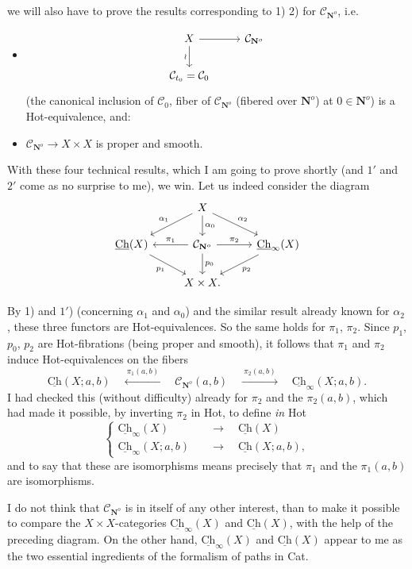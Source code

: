 \documentclass[11pt]{article}
\newcommand{\printedpage}[1]{\marginpar{\footnotesize p.~#1}}
\newcommand{\msp}[1]{\marginpar{\footnotesize [#1]}}
\newcommand{\Ch}{\underline{\mathrm{Ch}}}
\newcommand{\cC}{\mathcal{C}}
\newcommand{\NN}{\mathbf{N}^{o}}
\begin{document}
\printedpage{99}
we will also have to prove the results corresponding to 1) 2) for $\cC_{\NN}$, i.e.

\begin{itemize}[label={}]
\item[1$'$)]
\[
\begin{tikzcd}
X \ar[r] \ar[d,"\wr"'] & \cC_{\NN} \\
\cC_{t_0} = \cC_0 &
\end{tikzcd}
\]
(the canonical inclusion of $\cC_0$, fiber of $\cC_{\NN}$ (fibered over $\mathbf{N}^o$) at $0 \in \mathbf{N}^o$) is a Hot-equivalence, and:

\item[2$'$)] $\cC_{\NN} \longrightarrow X \times X$ is proper and smooth.
\end{itemize}

With these four technical results, which I am going to prove shortly (and $1'$ and $2'$ come as no surprise to me), we win. Let us indeed consider the diagram
\[
\begin{tikzcd}
& X \ar[dl,"\alpha_1"'] \ar[d,"\alpha_0"] \ar[dr,"\alpha_2"] & \\
\Ch(X) \ar[dr,"p_1"'] & \cC_{\NN} \ar[l,"\pi_1"'] \ar[r,"\pi_2"] \ar[d,"p_0"] & \Ch_{\infty}(X) \ar[dl,"p_2"] \\
& X \times X. &
\end{tikzcd}
\]

By 1) and $1'$) (concerning $\alpha_1$ and $\alpha_0$) and the similar result
\msp{page 159}
already known for $\alpha_2$, these three functors are Hot-equivalences. So the same holds for $\pi_1$, $\pi_2$. Since $p_1$, $p_0$, $p_2$ are Hot-fibrations (being proper and smooth), it follows that $\pi_1$ and $\pi_2$ induce Hot-equivalences on the fibers
\[
\Ch(X;a,b) \quad \xleftarrow{\ \pi_1(a,b)\ } \quad \cC_{\NN}(a,b) \quad \xrightarrow{\ \pi_2(a,b)\ } \quad \Ch_{\infty}(X;a,b).
\]
I had checked this (without difficulty) already for $\pi_2$ and the $\pi_2(a,b)$, which had made it possible, by inverting $\pi_2$ in Hot, to define \textit{in} Hot
\[
\left\{
\begin{aligned}
\Ch_{\infty}(X) &\quad\longrightarrow\quad \Ch(X) \\
\Ch_{\infty}(X;a,b) &\quad\longrightarrow\quad \Ch(X;a,b),
\end{aligned}
\right.
\]
and to say that these are isomorphisms means precisely that $\pi_1$ and the $\pi_1(a,b)$ are isomorphisms.

I do not think that $\cC_{\NN}$ is in itself of any other interest, than to make it possible to compare %
the $X \times X$-categories $\Ch_{\infty}(X)$ and $\Ch(X)$, with the help of the preceding diagram. On the other hand, $\Ch_{\infty}(X)$ and $\Ch(X)$ appear to me as the two essential ingredients of the formalism of %
paths in Cat.
\end{document}
